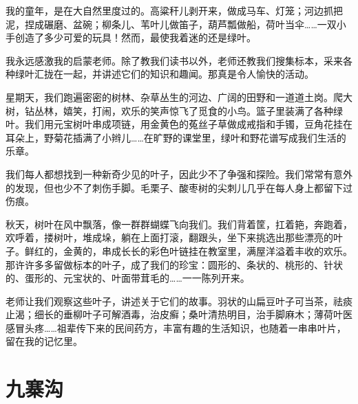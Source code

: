 \documentclass[12pt,UTF-8,openany]{ctexbook}
\begin{document}
\begin{Large}
    
    我的童年，是在大自然里度过的。高粱秆儿剥开来，做成马车、灯笼；河边抓把泥，捏成碾磨、盆碗；柳条儿、苇叶儿做笛子，葫芦瓢做船，荷叶当伞……一双小手创造了多少可爱的玩具！然而，最使我着迷的还是绿叶。
    
    我永远感激我的启蒙老师。除了教我们读书以外，老师还教我们搜集标本，采来各种绿叶汇拢在一起，并讲述它们的知识和趣闻。那真是令人愉快的活动。
    
    星期天，我们跑遍密密的树林、杂草丛生的河边、广阔的田野和一道道土岗。爬大树，钻丛林，嬉笑，打闹，欢乐的笑声惊飞了觅食的小鸟。篮子里装满了各种绿叶。我们用元宝树叶串成项链，用金黄色的菟丝子草做成戒指和手镯，豆角花挂在耳朵上，野菊花插满了小辫儿……在旷野的课堂里，绿叶和野花谱写成我们生活的乐章。
    
    我们每人都想找到一种新奇少见的叶子，因此少不了争强和探险。我们常常有意外的发现，但也少不了刺伤手脚。毛栗子、酸枣树的尖刺儿几乎在每人身上都留下过伤痕。
    
    秋天，树叶在风中飘落，像一群群蝴蝶飞向我们。我们背着筐，扛着筢，奔跑着，欢呼着，搂树叶，堆成垛，躺在上面打滚，翻跟头，坐下来挑选出那些漂亮的叶子。鲜红的，金黄的，串成长长的彩色叶链挂在教室里，满屋洋溢着丰收的欢乐。那许许多多留做标本的叶子，成了我们的珍宝：圆形的、条状的、桃形的、针状的、蛋形的、元宝状的、叶面带茸毛的……一一陈列开来。
    
    老师让我们观察这些叶子，讲述关于它们的故事。羽状的山扁豆叶子可当茶，祛痰止渴；细长的垂柳叶子可解酒毒，治皮癣；桑叶清热明目，治手脚麻木；薄荷叶医感冒头疼……祖辈传下来的民间药方，丰富有趣的生活知识，也随着一串串叶片，留在我的记忆里。
    
\end{Large}

\chapter{九寨沟}
\end{document}

